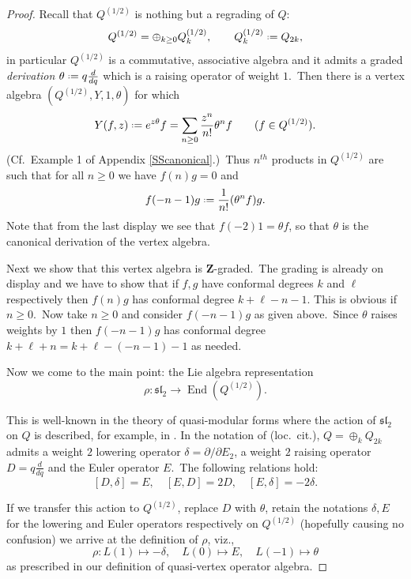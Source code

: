 \documentclass[12pt]{amsart}
\theoremstyle{plain}
\theoremstyle{definition}
\theoremstyle{remark}
\DeclareMathOperator{\Endo}{End}
\newcommand*{\df}{\mathrel{\vcenter{\baselineskip0.5ex \lineskiplimit0pt
                     \hbox{\scriptsize.}\hbox{\scriptsize.}}} =}
\newcommand{\ZZ}{\mathbf{Z}}
\begin{document}
\begin{proof}
Recall that $Q^{(1/2)}$ is nothing but a regrading of $Q$:
$$Q^{(1/2)}= \oplus_{k\geq0} Q^{(1/2)}_k, \quad\quad Q^{(1/2)}_k\df Q_{2k},$$
in particular $Q^{(1/2)}$ is a commutative, associative algebra and it admits a graded \emph{derivation} $\theta \df q\frac{d}{dq}$ which is a raising operator of weight $1$.\ Then there is a  vertex algebra $(Q^{(1/2)}, Y, 1, \theta)$ for which
\begin{equation}    
\label{Ydefn}
Y(f, z)\df e^{z\theta }f=\sum_{n\geq0} \frac{z^n}{n!} \theta^nf \quad\quad (f\in Q^{(1/2)}).
\end{equation}
(Cf.\  Example 1 of Appendix \ref{SScanonical}.)\
Thus $n^{th}$ products in $Q^{(1/2)}$ are such that for all $n\geq0$ we have $f(n)g=0$ and
\[f(-n-1)g \df \frac{1}{n!}(\theta^n f)g.\]
Note that from the last display we see that $f(-2)1= \theta f$, so that $\theta$ is the canonical derivation of the vertex algebra.

\medskip
Next we show that this vertex algebra is $\ZZ$-graded.\ The grading is already on display and we have to show that if $f, g$ have conformal degrees $k$ and $\ell$ respectively then $f(n)g$ has conformal degree $k+\ell-n-1$. This is obvious if $n\geq0$.\ Now take $n\geq0$ and consider
$f(-n-1)g$ as given above.\ Since $\theta$ raises weights by $1$ then
$f(-n-1)g$ has conformal degree $k+\ell+n= k+\ell-(-n-1)-1$ as needed.

\medskip
Now we come to the main point: the Lie algebra representation
$$\rho: \mathfrak{sl}_2\rightarrow \Endo(Q^{(1/2)}).$$

This is well-known in the theory of quasi-modular forms where the action of
$\mathfrak{sl}_2$ on $Q$ is described, for example, in \cite{Zagier123}. In the notation of (loc.\ cit.), $Q=\oplus_k Q_{2k}$ admits
a weight $2$ lowering operator $\delta=\partial/\partial E_2$, a weight $2$ raising operator $D=q\frac{d}{dq}$ and the Euler operator $E$.\ The following relations hold:
$$[D, \delta]=E,\quad [E, D]=2D,\quad  [E, \delta]=-2\delta.$$

If we transfer this action to $Q^{(1/2)}$, replace $D$ with $\theta$, retain the notations $\delta, E$ for the lowering  and Euler operators respectively on $Q^{(1/2)}$ (hopefully causing no confusion) we arrive at the definition of $\rho$, viz.,
\begin{equation}
 \label{rhodef}
  \rho: L(1) \mapsto -\delta,\quad  L(0)\mapsto E,\quad L(-1) \mapsto \theta   
\end{equation}
as prescribed in our definition of quasi-vertex operator algebra.


\end{proof}
\end{document}
